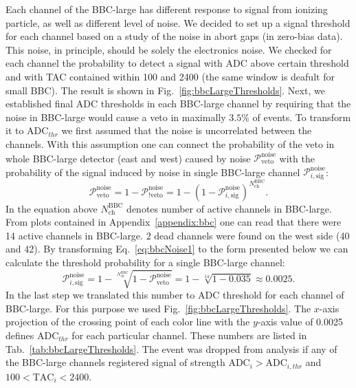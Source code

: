 Each channel of the BBC-large has different response to signal from ionizing particle, as well as different level of noise. We decided to set up a signal threshold for each channel based on a study of the noise in abort gaps (in zero-bias data). This noise, in principle, should be solely the electronics noise. We checked for each channel the probability to detect a signal with ADC above certain threshold and with TAC contained within 100 and 2400 (the same window is deafult for small BBC). The result is shown in Fig.~\ref{fig:bbcLargeThresholds}. Next, we established final ADC thresholds in each BBC-large channel by requiring that the noise in BBC-large would cause a veto in maximally $3.5\%$ of events. To transform it to $\text{ADC}_{thr}$ we first assumed that the noise is uncorrelated between the channels. With this assumption one can connect the probability of the veto in whole BBC-large detector (east and west) caused by noise $\mathcal{P}_{\text{veto}}^{\text{noise}}$ with the probability of the signal induced by noise in single BBC-large channel $\mathcal{P}_{i,\text{sig}}^{\text{noise}}$:
\begin{equation}\label{eq:bbcNoise1}
 \mathcal{P}_{\text{veto}}^{\text{noise}} = 1-\mathcal{P}_{!\text{veto}}^{\text{noise}} = 1-\left( 1-\mathcal{P}_{i,\text{sig}}^{\text{noise}} \right)^{N^{\text{BBC}}_{\text{ch}}}.
\end{equation}
In the equation above $N^{\text{BBC}}_{\text{ch}}$ denotes number of active channels in BBC-large. From plots contained in Appendix~\ref{appendix:bbc} one can read that there were 14 active channels in BBC-large. 2 dead channels were found on the west side (40 and 42). By transforming Eq.~\ref{eq:bbcNoise1} to the form presented below we can calculate the threshold probability for a single BBC-large channel:
\begin{equation}\label{eq:bbcNoise2}
 \mathcal{P}_{i,\text{sig}}^{\text{noise}} = 1-\sqrt[N^{\text{BBC}}_{\text{ch}}]{1-\mathcal{P}_{\text{veto}}^{\text{noise}}} = 1-\sqrt[14]{1-0.035} \approx 0.0025.
\end{equation}
In the last step we translated this number to ADC threshold for each channel of BBC-large. For this purpose we used Fig.~\ref{fig:bbcLargeThresholds}. The $x$-axis projection of the crossing point of each color line with the $y$-axis value of 0.0025 defines $\text{ADC}_{thr}$ for each particular channel. These numbers are listed in Tab.~\ref{tab:bbcLargeThresholds}. The event was dropped from analysis if any of the BBC-large channels registered signal of strength $\text{ADC}_{i}>\text{ADC}_{i,thr}$ and $100<\text{TAC}_{i}<2400$.



